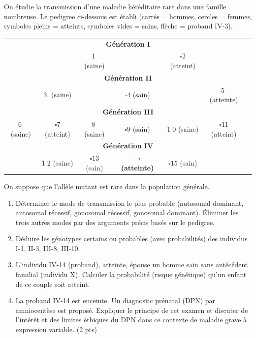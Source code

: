 \documentclass[11pt]{article}
\begin{document}
\begin{exercice}
On étudie la transmission d'une maladie héréditaire rare dans une famille nombreuse. Le pedigree ci-dessous est établi (carrés = hommes, cercles = femmes, symboles pleins = atteints, symboles vides = sains, flèche = proband IV-3).
\begin{center}
\begin{tabular}{ccccccc}
\multicolumn{7}{c}{\textbf{Génération I}} \\
& & \textcircled{1} (saine) & & $\square{2}$ (atteint) & & \\
\multicolumn{7}{c}{\textbf{Génération II}} \\
& \textcircled{3} (saine) & & $\square{4}$ (sain) & & \textcircled{5} (atteinte) & \\
\multicolumn{7}{c}{\textbf{Génération III}} \\
\textcircled{6} (saine) & $\square{7}$ (atteint) & \textcircled{8} (saine) & $\square{9}$ (sain) & \textcircled{10} (saine) & $\square{11}$ (atteint) & \\
\multicolumn{7}{c}{\textbf{Génération IV}} \\
& \textcircled{12} (saine) & $\square{13}$ (sain) & \textbf{$\rightarrow$ \text{\textcircled{14}} (atteinte)} & $\square{15}$ (sain) & & \\
\end{tabular}
\end{center}
On suppose que l'allèle mutant est rare dans la population générale.
\begin{enumerate}
\item Déterminer le mode de transmission le plus probable (autosomal dominant, autosomal récessif, gonosomal récessif, gonosomal dominant). Éliminer les trois autres modes par des arguments précis basés sur le pedigree.
\item Déduire les génotypes certains ou probables (avec probabilités) des individus I-1, II-3, III-8, III-10.
\item L'individu IV-14 (proband), atteinte, épouse un homme sain sans antécédent familial (individu X). Calculer la probabilité (risque génétique) qu'un enfant de ce couple soit atteint.
\item La proband IV-14 est enceinte. Un diagnostic prénatal (DPN) par amniocentèse est proposé. Expliquer le principe de cet examen et discuter de l'intérêt et des limites éthiques du DPN dans ce contexte de maladie grave à expression variable. (2 pts)
\end{enumerate}
\end{exercice}
\end{document}
